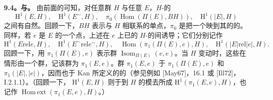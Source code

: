 \textbf{9.4。与。} 由前面的可知，对任意群 $H$ 与任意 $E$，$H$-的
\[
\mathrm H^1(E,H),\quad \mathrm H^1(E^\sim,H),\quad
\pi_0(\operatorname{Hom}(\Pi(E),BH)),\quad \mathrm H^1(|E|,H)
\]
之间有自然。回顾一下，$BH$ 表示与 $H$ 相联系的单点，$\pi_0$ 是把一个映到其的的。
同样，若 $e$ 是 $E$ 的一个点，上述在 $e$ 上已的 $H$-的间诱导；它们分别记作
\[
\mathrm H^1(E\mathrel{\mathrm{rel}}e,H),\quad
\mathrm H^1(E^\sim\mathrel{\mathrm{rel}}e^\sim,H),\quad
\operatorname{Hom}(\pi_1(\Pi(E),e),H),\quad
\mathrm H^1(|E|\mathrel{\mathrm{rel}}|e|,H).
\]
回顾一下，用 $\pi_1(\Pi(E),e)$ 表示群 $\operatorname{Isom}_{\Pi(E)}(e,e)$。当 $H$ 变动时，这些在情形由一个群，记该群为 $\pi_1(E,e)$。群 $\pi_1(E,e)$ 于 $\pi_1(\Pi(E),e)$ 和 $\pi_1(|E|,|e|)$，因而也于 Kan 所定义的的（参见例如 [May67]，16.1 或 [Ill72]，I.2.1.1）。（回顾一下， $\mathrm H^1(E,H)$ 则于到 $H$ 的模去所成 $\mathrm H^1(\pi_1(E,e),H)$，也记作 $\operatorname{Hom\,ext}(\pi_1(E,e),H)$。）


